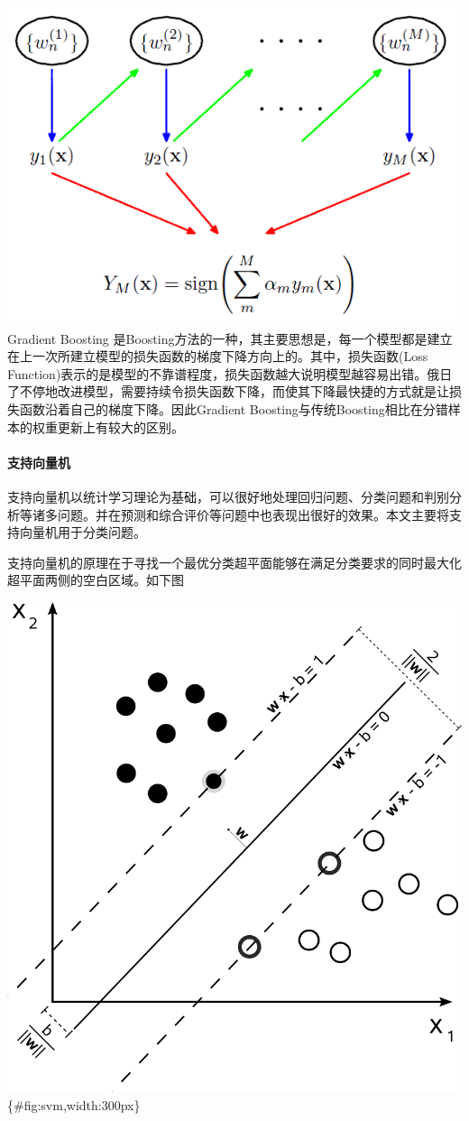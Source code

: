 \documentclass{article}
\begin{document}
\includegraphics{./images/boosting.png} Gradient Boosting
是Boosting方法的一种，其主要思想是，每一个模型都是建立在上一次所建立模型的损失函数的梯度下降方向上的。其中，损失函数(Loss
Function)表示的是模型的不靠谱程度，损失函数越大说明模型越容易出错。俄日了不停地改进模型，需要持续令损失函数下降，而使其下降最快捷的方式就是让损失函数沿着自己的梯度下降。因此Gradient
Boosting与传统Boosting相比在分错样本的权重更新上有较大的区别。

\paragraph{支持向量机}\label{ux652fux6301ux5411ux91cfux673a}

支持向量机以统计学习理论为基础，可以很好地处理回归问题、分类问题和判别分析等诸多问题。并在预测和综合评价等问题中也表现出很好的效果。本文主要将支持向量机用于分类问题。

支持向量机的原理在于寻找一个最优分类超平面能够在满足分类要求的同时最大化超平面两侧的空白区域。如下图

\includegraphics{./images/svm.png}\{\#fig:svm,width:300px\}
\end{document}
